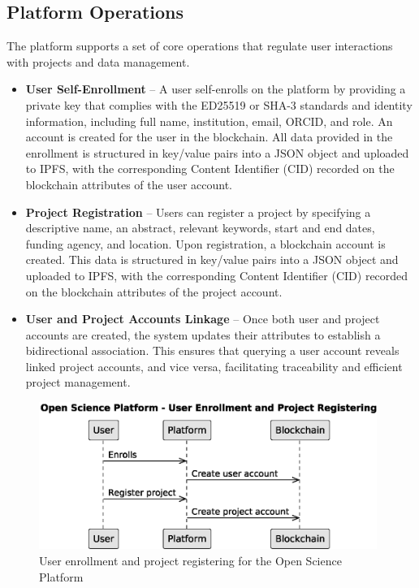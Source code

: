 \documentclass{article}
\begin{document}
\subsection{Platform Operations}
The platform supports a set of core operations that regulate user interactions with projects and data management.

\begin{itemize}
    \item \textbf{User Self-Enrollment} – A user self-enrolls on the platform by providing a private key that complies with the ED25519 or SHA-3 standards and identity information, including full name, institution, email, ORCID, and role. An account is created for the user in the blockchain. All data provided in the enrollment is structured in key/value pairs into a JSON object and uploaded to IPFS, with the corresponding Content Identifier (CID) recorded on the blockchain attributes of the user account.

    \item \textbf{Project Registration} – Users can register a project by specifying a descriptive name, an abstract, relevant keywords, start and end dates, funding agency, and location. Upon registration, a blockchain account is created. This data is structured in key/value pairs into a JSON object and uploaded to IPFS, with the corresponding Content Identifier (CID) recorded on the blockchain attributes of the project account.


    \item \textbf{User and Project Accounts Linkage} – Once both user and project accounts are created, the system updates their attributes to establish a bidirectional association. This ensures that querying a user account reveals linked project accounts, and vice versa, facilitating traceability and efficient project management.
\end{itemize}


\begin{figure}[htbp]
    \centering
    \includegraphics[width=0.98\textwidth, keepaspectratio]{c4_platform_operations_1}
    \caption{User enrollment and project registering for the Open Science Platform}
    \label{fig:c4_operations_diagram}
\end{figure}
\end{document}
